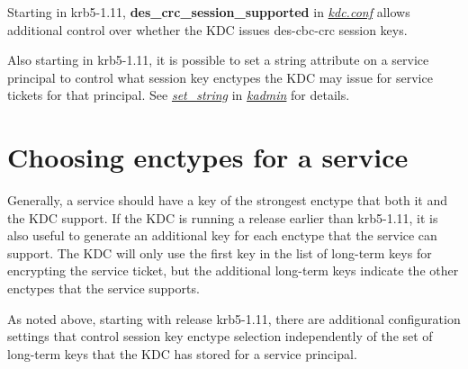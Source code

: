\documentclass[letterpaper,10pt,english]{sphinxmanual}
\begin{document}
Starting in krb5-1.11, \textbf{des\_crc\_session\_supported} in
{\hyperref[admin/conf_files/kdc_conf:kdc-conf-5]{\emph{kdc.conf}}} allows additional control over whether the KDC
issues des-cbc-crc session keys.

Also starting in krb5-1.11, it is possible to set a string attribute
on a service principal to control what session key enctypes the KDC
may issue for service tickets for that principal.  See
{\hyperref[admin/admin_commands/kadmin_local:set-string]{\emph{set\_string}}} in {\hyperref[admin/admin_commands/kadmin_local:kadmin-1]{\emph{kadmin}}} for details.


\section{Choosing enctypes for a service}
\label{admin/enctypes:choosing-enctypes-for-a-service}
Generally, a service should have a key of the strongest
enctype that both it and the KDC support.  If the KDC is running a
release earlier than krb5-1.11, it is also useful to generate an
additional key for each enctype that the service can support.  The KDC
will only use the first key in the list of long-term keys for encrypting
the service ticket, but the additional long-term keys indicate the
other enctypes that the service supports.

As noted above, starting with release krb5-1.11, there are additional
configuration settings that control session key enctype selection
independently of the set of long-term keys that the KDC has stored for
a service principal.
\end{document}
